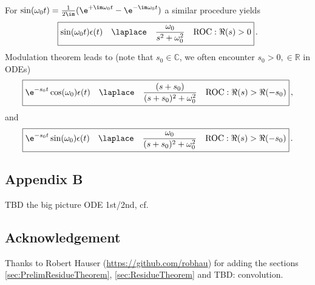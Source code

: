 \noindent For $\sin(\omega_0 t) = \frac{1}{2 \im} (\e^{+\im \omega_0 t}-\e^{-\im \omega_0 t})$ a similar
procedure yields
\begin{align}
\boxed{
\sin(\omega_0 t)\epsilon(t)\quad \laplace \quad \frac{\omega_0}{s^2 + \omega_0^2} \quad \text{ROC}: \Re(s)>0}\,.
\end{align}
%
Modulation theorem leads to (note that $s_0 \in \mathbb{C}$, we often encounter $s_0 > 0, \in \mathbb{R}$ in ODEs)
\begin{align}
\boxed{\e^{-s_0 t} \cos(\omega_0) \epsilon(t)\quad \laplace \quad \frac{(s+s_0)}{(s+s_0)^2 + \omega_0^2}\quad \text{ROC}: \Re(s)>\Re(-s_0)}\,,
\end{align}
and
\begin{align}
\boxed{\e^{-s_0 t} \sin(\omega_0) \epsilon(t)\quad \laplace \quad \frac{\omega_0}{(s+s_0)^2 + \omega_0^2}\quad \text{ROC}: \Re(s)>\Re(-s_0)}\,.
\end{align}


\newpage
\subsection*{Appendix B}
TBD the big picture ODE 1st/2nd, cf. \cite[p.117]{Strang2014}

\subsection*{Acknowledgement}
Thanks to Robert Hauser (\url{https://github.com/robhau})
for adding the sections \ref{sec:PrelimResidueTheorem}, \ref{sec:ResidueTheorem} and
TBD: convolution.

% 
% 
